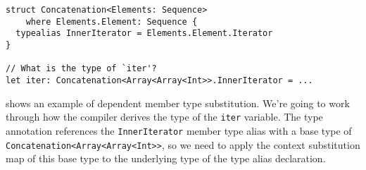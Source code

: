 \documentclass[../generics]{subfiles}
\begin{document}
\begin{listing}\label{dmt subst map listing}
\begin{Verbatim}
struct Concatenation<Elements: Sequence>
    where Elements.Element: Sequence {
  typealias InnerIterator = Elements.Element.Iterator
}

// What is the type of `iter'?
let iter: Concatenation<Array<Array<Int>>.InnerIterator = ...
\end{Verbatim}
\end{listing}
\begin{example}
 shows an example of dependent member type substitution. We're going to work through how the compiler derives the type of the \texttt{iter} variable.
The type annotation references the \texttt{InnerIterator} member type alias with a base type of \texttt{Concatenation<Array<Array<Int>>}, so we need to apply the context substitution map of this base type to the underlying type of the type alias declaration.


\end{example}
\end{document}
